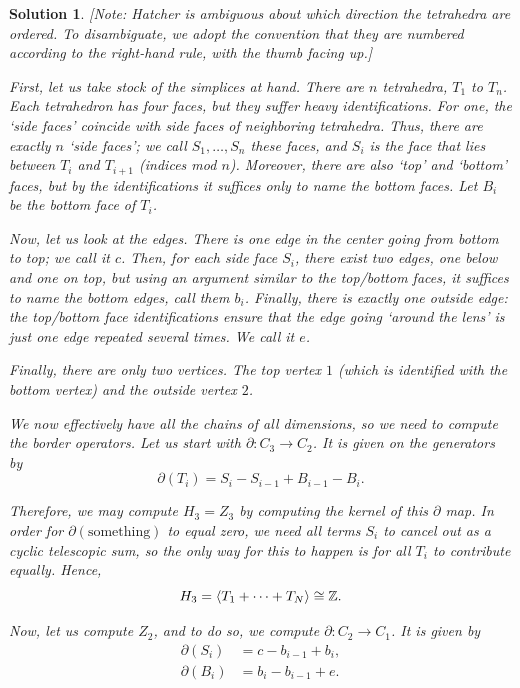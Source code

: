 \documentclass{article}
\theoremstyle{plain}
\theoremstyle{nonumberplain}
\newtheorem{sol}{Solution}
\newcommand{\Z}{\mathbb{Z}}
\DeclarePairedDelimiter{\braket}{\langle}{\rangle}
\begin{document}
\begin{sol}{}
[Note: Hatcher is ambiguous about which direction the tetrahedra are ordered. To disambiguate, we adopt the convention that they are numbered according to the right-hand rule, with the thumb facing up.]

First, let us take stock of the simplices at hand. There are $n$ tetrahedra, $T_1$ to $T_n$. Each tetrahedron has four faces, but they suffer heavy identifications. For one, the `side faces' coincide with side faces of neighboring tetrahedra. Thus, there are exactly $n$ `side faces'; we call $S_1, \dots, S_n$ these faces, and $S_i$ is the face that lies between $T_i$ and $T_{i+1}$ (indices mod $n$). Moreover, there are also `top' and `bottom' faces, but by the identifications it suffices only to name the bottom faces. Let $B_i$ be the bottom face of $T_i$.

Now, let us look at the edges. There is one edge in the center going from bottom to top; we call it $c$. Then, for each side face $S_i$, there exist two edges, one below and one on top, but using an argument similar to the top/bottom faces, it suffices to name the bottom edges, call them $b_i$. Finally, there is exactly one outside edge: the top/bottom face identifications ensure that the edge going `around the lens' is just one edge repeated several times. We call it $e$.

Finally, there are only two vertices. The top vertex $1$ (which is identified with the bottom vertex) and the outside vertex $2$.

We now effectively have all the chains of all dimensions, so we need to compute the border operators. Let us start with $\partial \colon C_3 \to C_2$. It is given on the generators by
\begin{equation}\label{eq:eq1}
\partial(T_i) = S_i - S_{i-1} + B_{i-1} - B_i.
\end{equation}

Therefore, we may compute $H_3 = Z_3$ by computing the kernel of this $\partial$ map. In order for $\partial(\text{something})$ to equal zero, we need all terms $S_i$ to cancel out as a cyclic telescopic sum, so the only way for this to happen is for all $T_i$ to contribute equally. Hence,
\begin{equation}
H_3 = \braket{T_1 + \dots + T_N} \cong \Z.
\end{equation}

Now, let us compute $Z_2$, and to do so, we compute $\partial \colon C_2 \to C_1$. It is given by
\begin{equation}\label{eq:eq2}
\begin{aligned}
\partial(S_i) &= c - b_{i-1} + b_i,\\
\partial(B_i) &= b_i - b_{i-1} + e.
\end{aligned}
\end{equation}


\end{sol}
\end{document}
